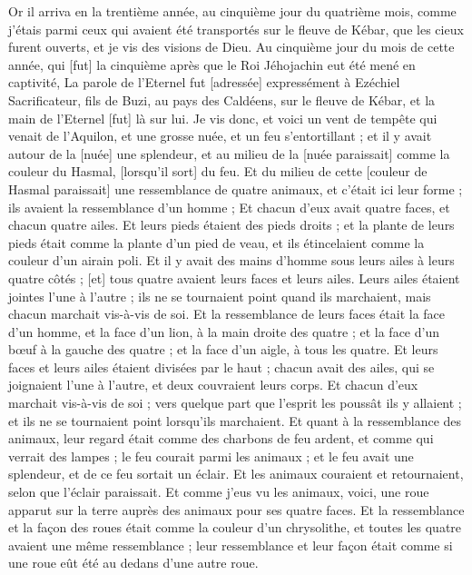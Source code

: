 \BFont
\begin{multicols}{2}
\VerseOne{}Or il arriva en la trentième année, au cinquième jour du quatrième mois, comme j'étais parmi ceux qui avaient été transportés sur le fleuve de Kébar, que les cieux furent ouverts, et je vis des visions de Dieu.
Au cinquième jour du mois de cette année, qui [fut] la cinquième après que le Roi Jéhojachin eut été mené en captivité,
La parole de l'Eternel fut [adressée] expressément à Ezéchiel Sacrificateur, fils de Buzi, au pays des Caldéens, sur le fleuve de Kébar, et la main de l'Eternel [fut] là sur lui.
Je vis donc, et voici un vent de tempête qui venait de l'Aquilon, et une grosse nuée, et un feu s'entortillant ; et il y avait autour de la [nuée] une splendeur, et au milieu de la [nuée paraissait] comme la couleur du Hasmal, [lorsqu'il sort] du feu.
Et du milieu de cette [couleur de Hasmal paraissait] une ressemblance de quatre animaux, et c'était ici leur forme ; ils avaient la ressemblance d'un homme ;
Et chacun d'eux avait quatre faces, et chacun quatre ailes.
Et leurs pieds étaient des pieds droits ; et la plante de leurs pieds était comme la plante d'un pied de veau, et ils étincelaient comme la couleur d'un airain poli.
Et il y avait des mains d'homme sous leurs ailes à leurs quatre côtés ; [et] tous quatre avaient leurs faces et leurs ailes.
Leurs ailes étaient jointes l'une à l'autre ; ils ne se tournaient point quand ils marchaient, mais chacun marchait vis-à-vis de soi.
Et la ressemblance de leurs faces était la face d'un homme, et la face d'un lion, à la main droite des quatre ; et la face d'un bœuf à la gauche des quatre ; et la face d'un aigle, à tous les quatre.
Et leurs faces et leurs ailes étaient divisées par le haut ; chacun avait des ailes, qui se joignaient l'une à l'autre, et deux couvraient leurs corps.
Et chacun d'eux marchait vis-à-vis de soi ; vers quelque part que l'esprit les poussât ils y allaient ; et ils ne se tournaient point lorsqu'ils marchaient.
Et quant à la ressemblance des animaux, leur regard était comme des charbons de feu ardent, et comme qui verrait des lampes ; le feu courait parmi les animaux ; et le feu avait une splendeur, et de ce feu sortait un éclair.
Et les animaux couraient et retournaient, selon que l'éclair paraissait.
Et comme j'eus vu les animaux, voici, une roue apparut sur la terre auprès des animaux pour ses quatre faces.
Et la ressemblance et la façon des roues était comme la couleur d'un chrysolithe, et toutes les quatre avaient une même ressemblance ; leur ressemblance et leur façon était comme si une roue eût été au dedans d'une autre roue.

\end{multicols}
